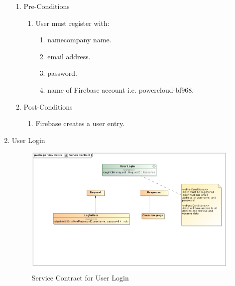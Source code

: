 \documentclass{article}
\begin{document}
\begin{enumerate}
		\begin{enumerate}
			\item  Pre-Conditions
			\begin{enumerate}
				\item	User must register with:
				\begin{enumerate}
					\item	namecompany name.
					\item	email address.
					\item	password.
					\item	name of Firebase account i.e. powercloud-bf968.
				\end{enumerate}
			\end{enumerate}
			\item  Post-Conditions		
			\begin{enumerate}
				\item	Firebase creates a user entry.
			\end{enumerate}
		\end{enumerate}
		\item	User Login
		
		\begin{figure}[H]
			\includegraphics[width=\textwidth]{images/LoginServiceContract.jpg}
			\caption{Service Contract for User Login \label{overflow}}
		\end{figure}
		

\end{enumerate}
\end{document}
